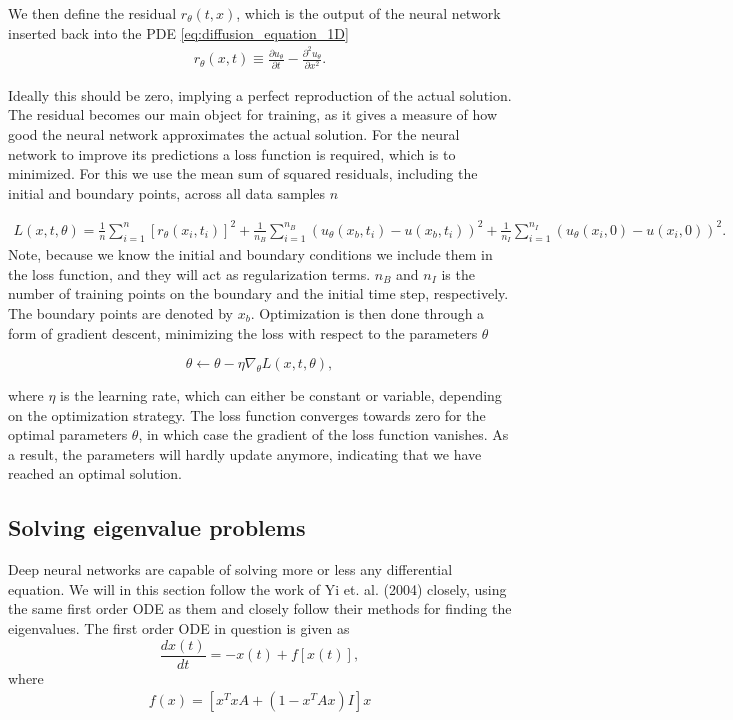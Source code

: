 \documentclass[12pt]{extarticle}
\begin{document}
\par We then define the residual $r_\theta(t, x)$, which is the output of the neural network inserted back into the PDE \eqref{eq:diffusion_equation_1D}
\begin{align}
	r_\theta(x, t) \equiv \frac{\partial u_\theta}{\partial t} - \frac{\partial^2 u_\theta}{\partial x^2}.
	\label{eq:residual}
\end{align}

Ideally this should be zero, implying a perfect reproduction of the actual solution. The residual becomes our main object for training, as it gives a measure of how good the neural network approximates the actual solution. For the neural network to improve its predictions a loss function is required, which is to minimized. For this we use the mean sum of squared residuals, including the initial and boundary points, across all data samples $n$ 

\begin{align}
	L(x, t, \theta) = \frac{1}{n} \sum_{i=1}^n [r_\theta(x_i,t_i)]^2 + \frac{1}{n_B}\sum_{i=1}^{n_B} (u_{\theta}(x_b,t_i) - u(x_b,t_i))^2 + \frac{1}{n_I} \sum_{i=1}^{n_I} (u_{\theta}(x_i,0) - u(x_i,0))^2.
	\label{eq:NN_loss}
\end{align}
Note, because we know the initial and boundary conditions we include them in the loss function, and they will act as regularization terms. $n_B$ and $n_I$ is the number of training points on the boundary and the initial time step, respectively. The boundary points are denoted by $x_b$.
Optimization is then done through a form of gradient descent, minimizing the loss with respect to the parameters $\theta$

\begin{equation}
	\theta \leftarrow \theta - \eta \nabla_{\theta}L(x,t,\theta),
\end{equation}

where $\eta$ is the learning rate, which can either be constant or variable, depending on the optimization strategy.
The loss function converges towards zero for the optimal parameters $\theta$, in which case the gradient of the loss function vanishes. As a result, the parameters will hardly update anymore, indicating that we have reached an optimal solution.


\subsection{Solving eigenvalue problems}

Deep neural networks are capable of solving more or less any differential equation. We will in this section follow the work of Yi et. al. (2004) \cite{yi2004neural} closely, using the same first order ODE as them and closely follow their methods for finding the eigenvalues. The first order ODE in question is given as     
\begin{equation}
	\frac{dx(t)}{dt} = -x(t) + f[x(t)],
	\label{eq:diff_eig}
\end{equation}
where
\begin{align}
	f(x) = [x^TxA + (1 - x^TAx)I]x
\end{align}
\end{document}

